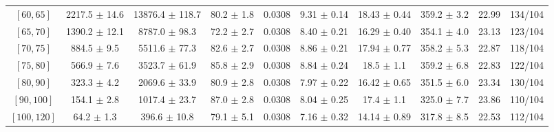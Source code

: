 \begin{tabular}{c||c|c|c|c|c|c|c||c|c}
$[60, 65]$ & 2217.5 $\pm$ 14.6 & 13876.4 $\pm$ 118.7 & 80.2 $\pm$ 1.8 & 0.0308 & 9.31 $\pm$ 0.14 & 18.43 $\pm$ 0.44 & 359.2 $\pm$ 3.2 & 22.99 & 134/104\\
$[65, 70]$ & 1390.2 $\pm$ 12.1 & 8787.0 $\pm$ 98.3 & 72.2 $\pm$ 2.7 & 0.0308 & 8.40 $\pm$ 0.21 & 16.29 $\pm$ 0.40 & 354.1 $\pm$ 4.0 & 23.13 & 123/104\\
$[70, 75]$ & 884.5 $\pm$ 9.5 & 5511.6 $\pm$ 77.3 & 82.6 $\pm$ 2.7 & 0.0308 & 8.86 $\pm$ 0.21 & 17.94 $\pm$ 0.77 & 358.2 $\pm$ 5.3 & 22.87 & 118/104\\
$[75, 80]$ & 566.9 $\pm$ 7.6 & 3523.7 $\pm$ 61.9 & 85.8 $\pm$ 2.9 & 0.0308 & 8.84 $\pm$ 0.24 & 18.5 $\pm$ 1.1 & 359.2 $\pm$ 6.8 & 22.83 & 122/104\\
$[80, 90]$ & 323.3 $\pm$ 4.2 & 2069.6 $\pm$ 33.9 & 80.9 $\pm$ 2.8 & 0.0308 & 7.97 $\pm$ 0.22 & 16.42 $\pm$ 0.65 & 351.5 $\pm$ 6.0 & 23.34 & 130/104\\
$[90, 100]$ & 154.1 $\pm$ 2.8 & 1017.4 $\pm$ 23.7 & 87.0 $\pm$ 2.8 & 0.0308 & 8.04 $\pm$ 0.25 & 17.4 $\pm$ 1.1 & 325.0 $\pm$ 7.7 & 23.86 & 110/104\\
$[100, 120]$ & 64.2 $\pm$ 1.3 & 396.6 $\pm$ 10.8 & 79.1 $\pm$ 5.1 & 0.0308 & 7.16 $\pm$ 0.32 & 14.14 $\pm$ 0.89 & 317.8 $\pm$ 8.5 & 22.53 & 112/104\\
\end{tabular}
